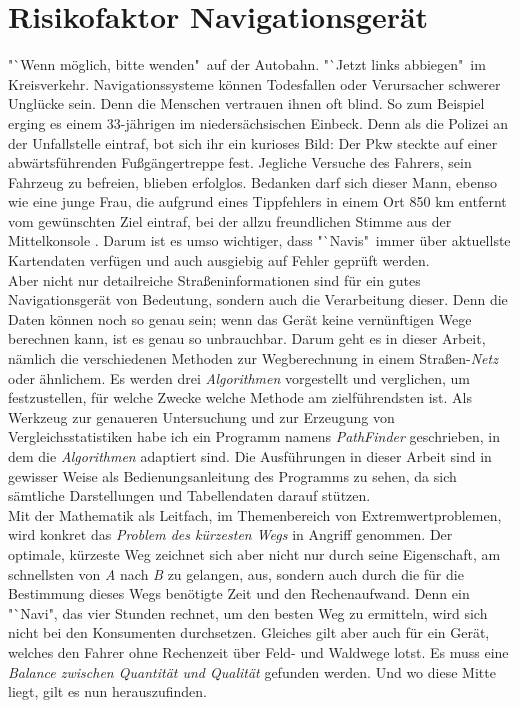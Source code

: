 \documentclass[12pt]{article}
\begin{document}
\section{Risikofaktor Navigationsgerät}
"`Wenn möglich, bitte wenden"\ auf der Autobahn. "`Jetzt links abbiegen"\ im Kreisverkehr. Navigationssysteme können Todesfallen oder Verursacher schwerer Unglücke sein. Denn die Menschen vertrauen ihnen oft blind. So zum Beispiel erging es einem 33-jährigen im niedersächsischen Einbeck. Denn als die Polizei an der Unfallstelle eintraf, bot sich ihr ein kurioses Bild: Der Pkw steckte auf einer abwärtsführenden Fußgängertreppe fest. Jegliche Versuche des Fahrers, sein Fahrzeug zu befreien, blieben erfolglos. Bedanken darf sich dieser Mann, ebenso wie eine junge Frau, die aufgrund eines Tippfehlers in einem Ort 850 km entfernt vom gewünschten Ziel eintraf, bei der allzu freundlichen Stimme aus der Mittelkonsole \cite{navi}. Darum ist es umso wichtiger, dass "`Navis"\ immer über aktuellste Kartendaten verfügen und auch ausgiebig auf Fehler geprüft werden. 
\\
Aber nicht nur detailreiche Straßeninformationen sind für ein gutes Navigationsgerät von Bedeutung, sondern auch die Verarbeitung dieser. Denn die Daten können noch so genau sein; wenn das Gerät keine vernünftigen Wege berechnen kann, ist es genau so unbrauchbar. Darum geht es in dieser Arbeit, nämlich die verschiedenen Methoden zur Wegberechnung in einem Straßen-\textit{Netz} oder ähnlichem. Es werden drei \textit{Algorithmen} vorgestellt und verglichen, um festzustellen, für welche Zwecke welche Methode am zielführendsten ist. Als Werkzeug zur genaueren Untersuchung und zur Erzeugung von Vergleichsstatistiken habe ich ein Programm namens \textit{PathFinder} geschrieben, in dem die \textit{Algorithmen} adaptiert sind. Die Ausführungen in dieser Arbeit sind in gewisser Weise als Bedienungsanleitung des Programms zu sehen, da sich sämtliche Darstellungen und Tabellendaten darauf stützen. 
\\
Mit der Mathematik als Leitfach, im Themenbereich von Extremwertproblemen, wird konkret das \textit{Problem des kürzesten Wegs} in Angriff genommen. Der optimale, kürzeste Weg zeichnet sich aber nicht nur durch seine Eigenschaft, am schnellsten von \textit{A} nach \textit{B} zu gelangen, aus, sondern auch durch die für die Bestimmung dieses Wegs benötigte Zeit und den Rechenaufwand. Denn ein "`Navi", das vier Stunden rechnet, um den besten Weg zu ermitteln, wird sich nicht bei den Konsumenten durchsetzen. Gleiches gilt aber auch für ein Gerät, welches den Fahrer ohne Rechenzeit über Feld- und Waldwege lotst. Es muss eine \textit{Balance zwischen Quantität und Qualität} gefunden werden. Und wo diese Mitte liegt, gilt es nun herauszufinden.
\newpage
\end{document}
